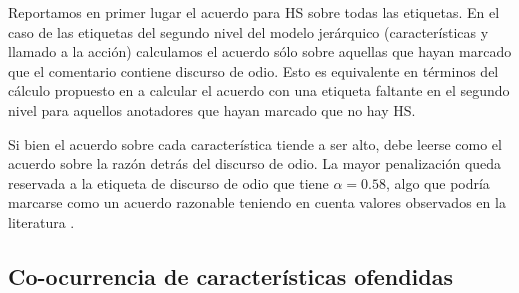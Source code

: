Reportamos en primer lugar el acuerdo para HS sobre todas las etiquetas. En el caso de las etiquetas del segundo nivel del modelo jerárquico (características y llamado a la acción) calculamos el acuerdo sólo sobre aquellas que hayan marcado que el comentario contiene discurso de odio. Esto es equivalente en términos del cálculo propuesto en \citet{krippendorff2018content} a calcular el acuerdo con una etiqueta faltante en el segundo nivel para aquellos anotadores que hayan marcado que no hay HS.

Si bien el acuerdo sobre cada característica tiende a ser alto, debe leerse como el acuerdo sobre la razón detrás del discurso de odio. La mayor penalización queda reservada a la etiqueta de discurso de odio que tiene $\alpha = 0.58$, algo que podría marcarse como un acuerdo razonable teniendo en cuenta valores observados en la literatura \cite{poletto2021resources}.



\subsection{Co-ocurrencia de características ofendidas}

